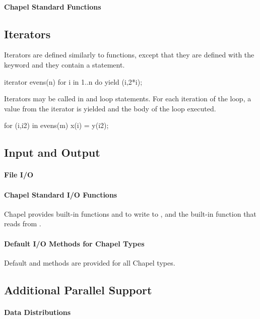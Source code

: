 \paragraph{Chapel Standard Functions}

\subsection{Iterators}
Iterators are defined similarly to functions, except that
they are defined with the keyword  and they
contain a  statement.
\begin{chapel}
iterator evens(n) {
  for i in 1..n do yield (i,2*i);
}
\end{chapel}
Iterators may be called in  and  loop
statements.  For each iteration of the loop, a value from the
iterator is yielded and the body of the loop executed.
\begin{chapel}
for (i,i2) in evens(m) {
  x(i) = y(i2);
}
\end{chapel}


\subsection{Input and Output}
\paragraph{File I/O}

\paragraph{Chapel Standard I/O Functions}
Chapel provides built-in functions  and 
to write to , and the built-in function 
that reads from .

\paragraph{Default I/O Methods for Chapel Types}
Default  and  methods are provided for all
Chapel types.


\subsection{Additional Parallel Support}
\paragraph{Data Distributions}
